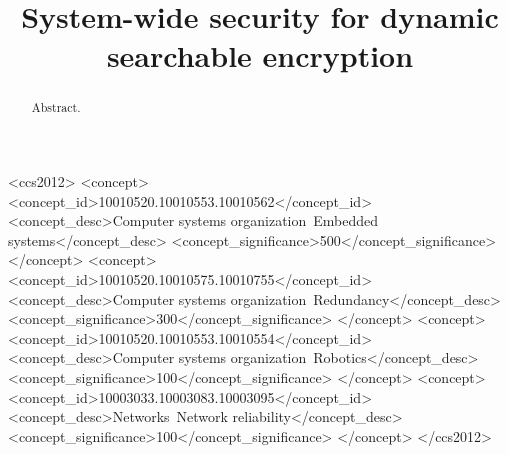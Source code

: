 \documentclass[sigconf]{acmart}
\begin{document}
\title{System-wide security for dynamic searchable encryption}

\author{}
\email{}
\orcid{}
\author{}
\email{}
\affiliation{%
  \institution{}
  \streetaddress{}
  \city{}
  \state{}
  \country{}
  \postcode{}
}


\begin{abstract}
Abstract.
\end{abstract}
\maketitle
{}
\begin{CCSXML}
<ccs2012>
 <concept>
  <concept_id>10010520.10010553.10010562</concept_id>
  <concept_desc>Computer systems organization~Embedded systems</concept_desc>
  <concept_significance>500</concept_significance>
 </concept>
 <concept>
  <concept_id>10010520.10010575.10010755</concept_id>
  <concept_desc>Computer systems organization~Redundancy</concept_desc>
  <concept_significance>300</concept_significance>
 </concept>
 <concept>
  <concept_id>10010520.10010553.10010554</concept_id>
  <concept_desc>Computer systems organization~Robotics</concept_desc>
  <concept_significance>100</concept_significance>
 </concept>
 <concept>
  <concept_id>10003033.10003083.10003095</concept_id>
  <concept_desc>Networks~Network reliability</concept_desc>
  <concept_significance>100</concept_significance>
 </concept>
</ccs2012>
\end{CCSXML}
\end{document}
